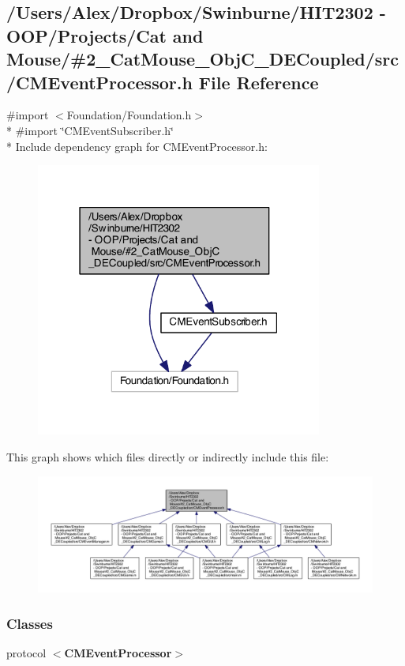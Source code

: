 \subsection{/\-Users/\-Alex/\-Dropbox/\-Swinburne/\-H\-I\-T2302 -\/ O\-O\-P/\-Projects/\-Cat and Mouse/\#2\-\_\-\-Cat\-Mouse\-\_\-\-Obj\-C\-\_\-\-D\-E\-Coupled/src/\-C\-M\-Event\-Processor.h File Reference}
\label{_c_m_event_processor_8h}
{\ttfamily \#import $<$Foundation/\-Foundation.\-h$>$}\\*
{\ttfamily \#import \char`\"{}C\-M\-Event\-Subscriber.\-h\char`\"{}}\\*
Include dependency graph for C\-M\-Event\-Processor.\-h\-:
\nopagebreak
\begin{figure}[H]
\begin{center}
\leavevmode
\includegraphics[width=267pt]{_c_m_event_processor_8h__incl}
\end{center}
\end{figure}
This graph shows which files directly or indirectly include this file\-:
\nopagebreak
\begin{figure}[H]
\begin{center}
\leavevmode
\includegraphics[width=350pt]{_c_m_event_processor_8h__dep__incl}
\end{center}
\end{figure}
\subsubsection*{Classes}
\begin{DoxyCompactItemize}
\item 
protocol {\bf $<$\-C\-M\-Event\-Processor$>$}
\end{DoxyCompactItemize}
